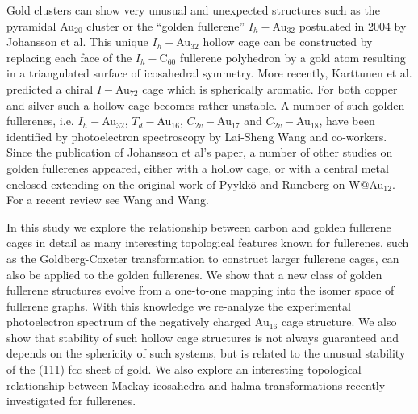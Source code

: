 Gold clusters can show very unusual and unexpected structures such as the pyramidal Au$_{20}$ cluster\autocite{Li-2003,Fielicke-2008,Assadollahzadeh_systematicsearchminimum_2009} or the ``golden fullerene'' $I_h-$Au$_{32}$ postulated in 2004 by Johansson et al.\autocite{Johansson_Au3224CaratGolden_2004} This unique $I_h-$Au$_{32}$ hollow cage can be constructed by replacing each face of the $I_h-$C$_{60}$ fullerene polyhedron by a gold atom resulting in a triangulated surface of icosahedral symmetry.\autocite{Johansson_Au3224CaratGolden_2004} More recently, Karttunen et al. predicted a chiral $I-$Au$_{72}$ cage which is spherically aromatic.\autocite{Karttunen_IcosahedralAu72_2008}
For both copper and silver such a hollow cage becomes rather unstable.\autocite{Johansson_Au3224CaratGolden_2004,Fernandez-2006a}
A number of such golden fullerenes, i.e. $I_h-$Au$_{32}^-$, $T_d-$Au$_{16}^-$, $C_{2v}-$Au$_{17}^-$ and $C_{2v}-$Au$_{18}^-$, have been identified by photoelectron spectroscopy by Lai-Sheng Wang and co-workers.\autocite{Ji-2005,Bulusu_Evidencehollowgolden_2006}
Since the publication of Johansson et al's paper\autocite{Johansson_Au3224CaratGolden_2004}, a number of other studies on golden fullerenes appeared, either with a hollow cage,\autocite{Gu-2004,Fernandez-2006,Fa-Dong-2006,Fa-Zhou-2006,Karttunen_IcosahedralAu72_2008,Fa-Luong-2008,Chen_Structuresneutralanionic_2010,Tian-2011,De-2012,Ning-2014,Joshi-2015} or with a central metal enclosed\autocite{Autschbach_PropertiesWAu12_2004,Zhai-2004,Gao-Bulusu-2005,Wang_Dopinggoldencage_2007,Wang_DopingGoldenBuckyballs_2007,Fa-Dong-2008a,Munoz-2013,Manna-2013,Tang-2013} extending on the original work of Pyykk\"o and Runeberg on W@Au$_{12}$.\autocite{Pyykko_IcosahedralWAu12Predicted_2002,Li_Experimentalobservationconfirmation_2002} For a recent review see Wang and Wang.\autocite{Wang-Wang-2012}

In this study we explore the relationship between carbon and golden fullerene cages in detail as many interesting topological features known for fullerenes,\autocite{Cataldo-Ori-2011,Schwerdtfeger_topologyfullerenes_2015} such as the Goldberg-Coxeter transformation to construct larger fullerene cages,\autocite{Goldberg_ClassMultiSymmetricPolyhedra_1937,Coxeter-1971} can also be applied to the golden fullerenes. We show that a new class of golden fullerene structures evolve from a one-to-one mapping into the isomer space of fullerene graphs. With this knowledge we re-analyze the experimental photoelectron spectrum of the negatively charged Au$_{16}^-$ cage structure. We also show that stability of such hollow cage structures is not always guaranteed and depends on the sphericity of such systems, but is related to the unusual stability of the (111) fcc sheet of gold. We also explore an interesting topological relationship between Mackay icosahedra and halma transformations recently investigated for fullerenes.\autocite{Schwerdtfeger_topologyfullerenes_2015}

